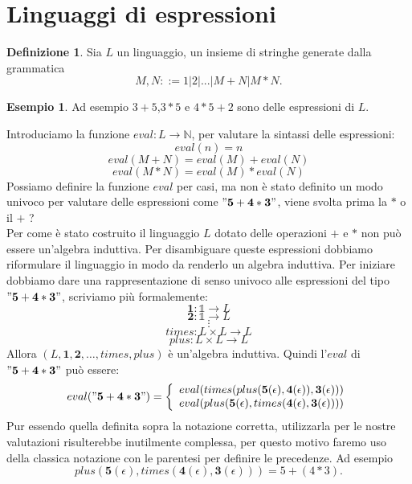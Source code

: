 \documentclass{article}
\theoremstyle{definition}
\theoremstyle{definition}
\theoremstyle{definition}
\newtheorem{definition}[theorem]{Definizione}
\newtheorem{example}[theorem]{Esempio}
\theoremstyle{remark}
\begin{document}
\section{Linguaggi di espressioni}
\begin{definition}
    Sia $L$ un linguaggio, un insieme di stringhe generate dalla grammatica
    $$M,N ::= 1|2|...|M+N|M*N.$$
\end{definition}
\begin{example}
    Ad esempio $3+5$,$3*5$ e $4*5+2$ sono delle espressioni di $L$.
\end{example}
Introduciamo la funzione $eval:L\to \mathbb{N}$, per valutare la sintassi delle espressioni:
$$eval(n) = n$$
$$eval(M+N) = eval(M) + eval(N)$$
$$eval(M*N) = eval(M) * eval(N)$$
Possiamo definire la funzione $eval$ per casi, ma non è stato definito un modo univoco per
valutare delle espressioni come $\mathbf{"5+4*3"}$, viene svolta prima la $*$ o il $+$ ?\\ Per come è stato costruito il linguaggio $L$ dotato delle operazioni $+$ e $*$ non può essere un'algebra induttiva. Per disambiguare queste espressioni dobbiamo riformulare  il linguaggio in modo da renderlo un algebra induttiva.
Per iniziare dobbiamo dare una rappresentazione di senso univoco alle espressioni del tipo $\mathbf{"5+4*3"}$, scriviamo più formalemente:
$$\mathbf{1}:\mathds{1}\to L$$
$$\mathbf{2}:\mathds{1}\to L$$
$$\vdots$$
$$times:L\times L\to L$$
$$plus :L\times L\to L$$
Allora $(L,\mathbf{1},\mathbf{2},\dots,times,plus)$ è un'algebra induttiva.
\newpage
Quindi l'$eval$ di  $\mathbf{"5+4*3"}$ può essere:
$$eval(\mathbf{"5+4*3"}) = \left\{ \begin{array}{cl}
        eval(times(plus(\mathbf{5}(\epsilon),\mathbf{4}(\epsilon)),\mathbf{3}(\epsilon))) \\
        eval(plus(\mathbf{5}(\epsilon),times(\mathbf{4}(\epsilon),\mathbf{3}(\epsilon))))
    \end{array}\right.$$
Pur essendo quella definita sopra la notazione corretta, utilizzarla per le nostre valutazioni risulterebbe
inutilmente complessa, per questo motivo faremo uso della classica notazione con le parentesi per definire le precedenze.
Ad esempio $$plus(\mathbf{5}(\epsilon),times(\mathbf{4}(\epsilon),\mathbf{3}(\epsilon))) = 5+(4*3).$$
\end{document}
